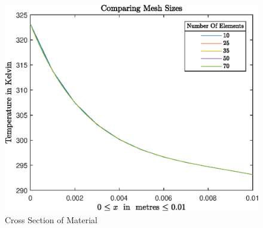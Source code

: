 \documentclass[11pt]{article}
\begin{document}
\begin{figure}[h!] \label{fig:fullviewmesh}
    \centering
    \includegraphics{epsMesh01}
    \caption{Cross Section of Material }
\end{figure}
\clearpage
\end{document}
